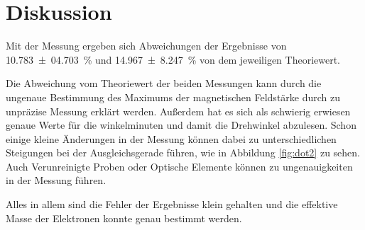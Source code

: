 \section{Diskussion}
\label{sec:Diskussion}
Mit der Messung ergeben sich Abweichungen der Ergebnisse von \SI{10.783 +- 04.703}{\percent} und \SI{14.967 +- 8.247}{\percent} von dem jeweiligen Theoriewert.

Die Abweichung vom Theoriewert der beiden Messungen kann durch die ungenaue Bestimmung des Maximums der magnetischen Feldstärke durch zu unpräzise Messung erklärt werden.
Außerdem hat es sich als schwierig erwiesen genaue Werte für die winkelminuten und damit die Drehwinkel abzulesen.
Schon einige kleine Änderungen in der Messung können dabei zu unterschiedlichen Steigungen bei der Ausgleichsgerade führen, wie in Abbildung \ref{fig:dot2} zu sehen.
Auch Verunreinigte Proben oder Optische Elemente können zu ungenauigkeiten in der Messung führen.

Alles in allem sind die Fehler der Ergebnisse klein gehalten und die effektive Masse der Elektronen konnte genau bestimmt werden.